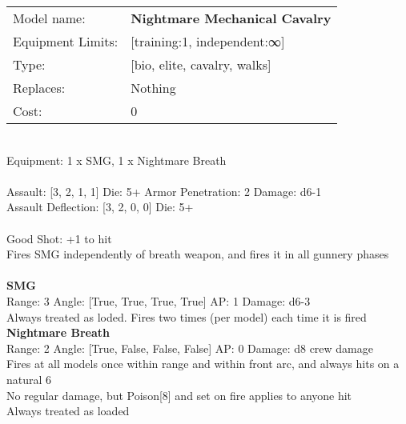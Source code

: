 \noindent
\begin{tabular}{ll}
Model name: &{\bf Nightmare Mechanical Cavalry } \\
Equipment Limits: &[training:1, independent:∞] \\
Type: &[bio, elite, cavalry, walks] \\
Replaces: &Nothing \\
Cost: & 0\\
\end{tabular}
\ \\
Equipment: 1 x SMG, 1 x Nightmare Breath \\
\ \\
Assault: [3, 2, 1, 1] Die: 5+ Armor Penetration: 2 Damage: d6-1 \\
Assault Deflection: [3, 2, 0, 0] Die: 5+\\
\indent  
\ \\
Good Shot: +1 to hit\\ 
Fires SMG independently of breath weapon, and fires it in all gunnery phases\\ 

\ \\
{\bf SMG } \\



Range: 3  Angle: [True, True, True, True] AP: 1 Damage: d6-3 \\
Always treated as loded. Fires two times (per model) each time it is fired\\ 




{\bf Nightmare Breath } \\



Range: 2  Angle: [True, False, False, False] AP: 0 Damage: d8 crew damage \\
Fires at all models once within range and within front arc, and always hits on a natural 6\\ 
No regular damage, but Poison[8] and set on fire applies to anyone hit\\ 
Always treated as loaded\\ 




 
\ \\













